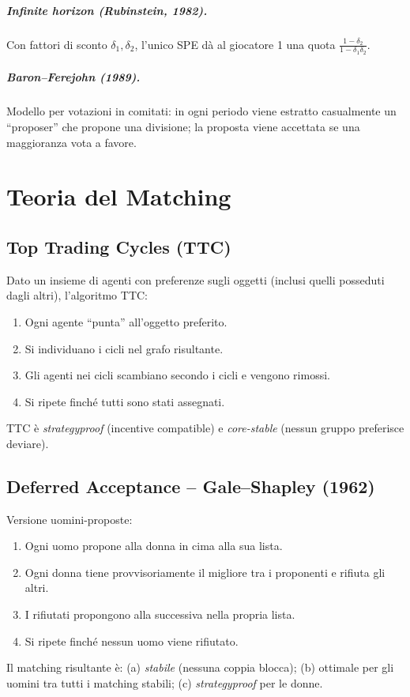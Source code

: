 \documentclass[12pt,a4paper,twoside]{book}
\theoremstyle{plain}
\theoremstyle{definition}
\begin{document}
\paragraph{Infinite horizon (Rubinstein, 1982).} Con fattori di sconto $\delta_1,\delta_2$, l'unico SPE dà al giocatore 1 una quota $\frac{1-\delta_2}{1-\delta_1\delta_2}$.

\paragraph{Baron--Ferejohn (1989).} Modello per votazioni in comitati: in ogni periodo viene estratto casualmente un ``proposer'' che propone una divisione; la proposta viene accettata se una maggioranza vota a favore.

\chapter{Teoria del Matching}
\label{app:matching}

\section{Top Trading Cycles (TTC)}

Dato un insieme di agenti con preferenze sugli oggetti (inclusi quelli posseduti dagli altri), l'algoritmo TTC:
\begin{enumerate}
  \item Ogni agente ``punta'' all'oggetto preferito.
  \item Si individuano i cicli nel grafo risultante.
  \item Gli agenti nei cicli scambiano secondo i cicli e vengono rimossi.
  \item Si ripete finché tutti sono stati assegnati.
\end{enumerate}
TTC è \emph{strategyproof} (incentive compatible) e \emph{core-stable} (nessun gruppo preferisce deviare).

\section{Deferred Acceptance -- Gale--Shapley (1962)}

Versione uomini-proposte:
\begin{enumerate}
  \item Ogni uomo propone alla donna in cima alla sua lista.
  \item Ogni donna tiene provvisoriamente il migliore tra i proponenti e rifiuta gli altri.
  \item I rifiutati propongono alla successiva nella propria lista.
  \item Si ripete finché nessun uomo viene rifiutato.
\end{enumerate}
Il matching risultante è: (a) \emph{stabile} (nessuna coppia blocca); (b) ottimale per gli uomini tra tutti i matching stabili; (c) \emph{strategyproof} per le donne.
\end{document}
